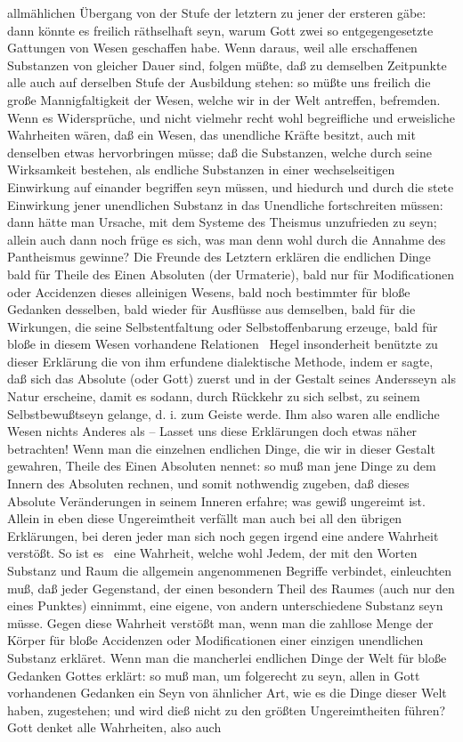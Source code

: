 allmählichen Übergang von der Stufe der letztern zu jener der ersteren gäbe: dann könnte es freilich räthselhaft seyn, warum Gott zwei so entgegengesetzte Gattungen von Wesen geschaffen habe. Wenn daraus, weil alle erschaffenen Substanzen von gleicher Dauer sind, folgen müßte, daß zu demselben Zeitpunkte alle auch auf derselben Stufe der Ausbildung stehen: so müßte uns freilich die große Mannigfaltigkeit der Wesen, welche wir in der Welt antreffen, befremden. Wenn es Widersprüche, und nicht vielmehr recht wohl begreifliche und erweisliche Wahrheiten wären, daß ein Wesen, das unendliche Kräfte besitzt, auch mit denselben etwas hervorbringen müsse; daß die Substanzen, welche durch seine Wirksamkeit bestehen, als endliche Substanzen in einer wechselseitigen Einwirkung auf einander begriffen seyn müssen, und hiedurch und durch die stete Einwirkung jener unendlichen Substanz in das Unendliche fortschreiten müssen: dann hätte man Ursache, mit dem Systeme des Theismus unzufrieden zu seyn; allein auch dann noch früge es sich, was man denn wohl durch die Annahme des Pantheismus gewinne? Die Freunde des Letztern erklären die endlichen Dinge bald für Theile des Einen Absoluten (der Urmaterie), bald nur für Modificationen oder Accidenzen dieses alleinigen Wesens, bald noch bestimmter für bloße Gedanken desselben, bald wieder für Ausflüsse aus demselben, bald für die Wirkungen, die  seine Selbstentfaltung oder Selbstoffenbarung erzeuge, bald für bloße in diesem Wesen vorhandene Relationen \usw\ Hegel insonderheit benützte zu dieser Erklärung die von ihm erfundene dialektische Methode, indem er sagte, daß sich das Absolute (oder Gott) zuerst  und in der Gestalt seines Andersseyn als Natur erscheine, damit es sodann, durch Rückkehr zu sich selbst, zu seinem Selbstbewußtseyn gelange, d. i. zum Geiste werde. Ihm also waren alle endliche Wesen nichts Anderes als  -- Lasset uns diese Erklärungen doch etwas näher betrachten! Wenn man die einzelnen endlichen Dinge, die wir in dieser Gestalt gewahren, Theile des Einen Absoluten nennet: so muß man jene Dinge zu dem Innern des Absoluten rechnen, und somit nothwendig zugeben, daß dieses Absolute Veränderungen in seinem Inneren erfahre; was gewiß ungereimt ist. Allein in eben diese Ungereimtheit verfällt man auch bei all den übrigen Erklärungen, bei deren jeder man sich noch gegen irgend eine andere Wahrheit verstößt. So ist es \zB\ eine Wahrheit, welche wohl Jedem, der mit den Worten Substanz und Raum die allgemein angenommenen Begriffe verbindet, einleuchten muß, daß jeder Gegenstand, der einen besondern Theil des Raumes (auch nur den eines Punktes) einnimmt, eine eigene, von andern unterschiedene Substanz seyn müsse. Gegen diese Wahrheit verstößt man, wenn man die zahllose Menge der Körper für bloße Accidenzen oder Modificationen einer einzigen unendlichen Substanz erkläret. Wenn man die mancherlei endlichen Dinge der Welt für bloße Gedanken Gottes erklärt: so muß man, um folgerecht zu seyn, allen in Gott vorhandenen Gedanken ein Seyn von ähnlicher Art, wie es die Dinge dieser Welt haben, zugestehen; und wird dieß nicht zu den größten Ungereimtheiten führen? Gott denket alle Wahrheiten, also auch 
